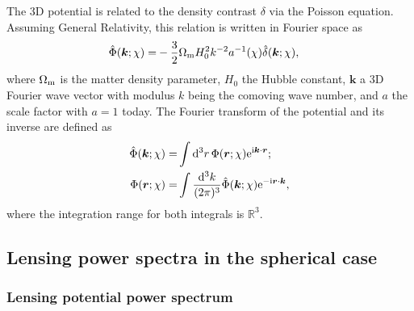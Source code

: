 \documentclass[fleqn,usenatbib]{mnras} %
\renewcommand{\vec}{\bm}
\begin{document}
The 3D potential is related to the density contrast $\delta$ via the Poisson
equation. Assuming General Relativity, this relation is written in Fourier space as
%
\begin{align}
  \hat \Phi(\vec k; \chi) = & - \frac 3 2 \Omega_{\rm m} H_0^2 k^{-2} a^{-1}(\chi) \hat \delta(\vec k; \chi),
      \label{eq:poisson}
\end{align}
%
where $\Omega_{\rm m}$ is the matter density parameter, $H_0$ the Hubble
constant, $\vec k$ a 3D Fourier wave vector with modulus $k$ being the comoving
wave number, and $a$ the scale factor with $a=1$ today. The Fourier transform
of the potential and its inverse are defined as
%
\begin{align}
  \hat \Phi(\vec k; \chi) = &  \int {\rm d}^3 r \, \Phi(\vec r; \chi) {\rm e}^{{\rm i} \vec k \cdot \vec r} ;
  \label{eq:hatPhi}
  \\
  \Phi(\vec r; \chi) = &  \int \frac{{\rm d}^3 k}{(2\pi)^3}
      \hat \Phi(\vec k; \chi) {\rm e}^{-{\rm i} \vec r \cdot \vec k},
  \label{eq:hatPhi_inv}
\end{align}
%
where the integration range for both integrals is $\mathbb{R}^3$.


\subsection{Lensing power spectra in the spherical case}

\subsubsection{Lensing potential power spectrum}
\end{document}
